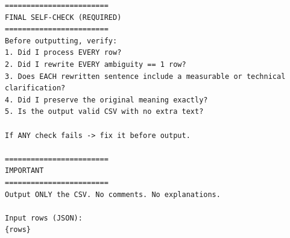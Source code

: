 \begin{lstlisting}[basicstyle=\ttfamily\footnotesize, breaklines=true, breakatwhitespace=false, frame=single, numbers=none, xleftmargin=10pt, xrightmargin=10pt]
========================
FINAL SELF-CHECK (REQUIRED)
========================
Before outputting, verify:
1. Did I process EVERY row?
2. Did I rewrite EVERY ambiguity == 1 row?
3. Does EACH rewritten sentence include a measurable or technical clarification?
4. Did I preserve the original meaning exactly?
5. Is the output valid CSV with no extra text?

If ANY check fails -> fix it before output.

========================
IMPORTANT
========================
Output ONLY the CSV. No comments. No explanations.

Input rows (JSON):
{rows}
\end{lstlisting}
